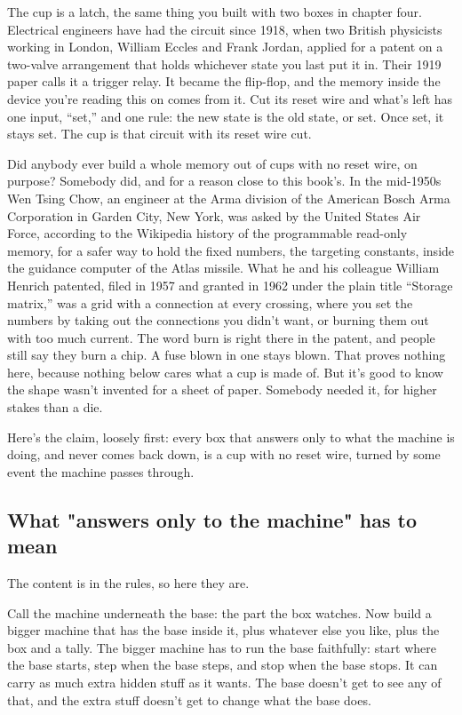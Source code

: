 \documentclass[11pt,twoside]{article}
\theoremstyle{thielethm}
\theoremstyle{thieledef}
\theoremstyle{thieledef}
\theoremstyle{thieledef}
\theoremstyle{thielethm}
\theoremstyle{thieleobs}
\theoremstyle{thielethm}
\begin{document}
The cup is a latch, the same thing you built with two boxes in chapter four. Electrical engineers have had the circuit since 1918, when two British physicists working in London, William Eccles and Frank Jordan, applied for a patent on a two-valve arrangement that holds whichever state you last put it in. Their 1919 paper calls it a trigger relay. It became the flip-flop, and the memory inside the device you're reading this on comes from it. Cut its reset wire and what's left has one input, ``set,'' and one rule: the new state is the old state, or set. Once set, it stays set. The cup is that circuit with its reset wire cut.

Did anybody ever build a whole memory out of cups with no reset wire, on purpose? Somebody did, and for a reason close to this book's. In the mid-1950s Wen Tsing Chow, an engineer at the Arma division of the American Bosch Arma Corporation in Garden City, New York, was asked by the United States Air Force, according to the Wikipedia history of the programmable read-only memory, for a safer way to hold the fixed numbers, the targeting constants, inside the guidance computer of the Atlas missile. What he and his colleague William Henrich patented, filed in 1957 and granted in 1962 under the plain title ``Storage matrix,'' was a grid with a connection at every crossing, where you set the numbers by taking out the connections you didn't want, or burning them out with too much current. The word burn is right there in the patent, and people still say they burn a chip. A fuse blown in one stays blown. That proves nothing here, because nothing below cares what a cup is made of. But it's good to know the shape wasn't invented for a sheet of paper. Somebody needed it, for higher stakes than a die.

Here's the claim, loosely first: every box that answers only to what the machine is doing, and never comes back down, is a cup with no reset wire, turned by some event the machine passes through.

\subsection{What "answers only to the machine" has to mean}

The content is in the rules, so here they are.

Call the machine underneath the base: the part the box watches. Now build a bigger machine that has the base inside it, plus whatever else you like, plus the box and a tally. The bigger machine has to run the base faithfully: start where the base starts, step when the base steps, and stop when the base stops. It can carry as much extra hidden stuff as it wants. The base doesn't get to see any of that, and the extra stuff doesn't get to change what the base does.
\end{document}
